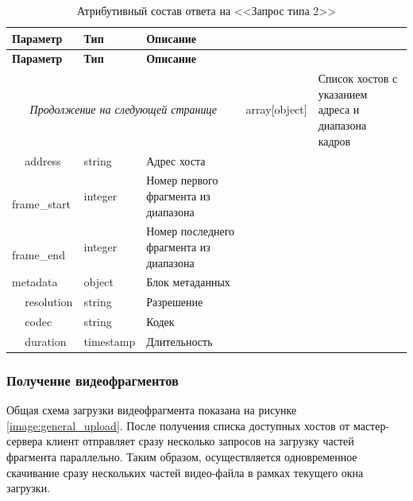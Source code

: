 \begin{longtable}{|p{4cm}|p{3cm}|p{8.5cm}|}
	\caption{Атрибутивный состав ответа на <<Запрос типа 2>>}\label{tbl:complaint_response}\\
	\hline
	
	\textbf{Параметр} & \textbf{Тип} & \textbf{Описание}\\ 
	\hline
	\endfirsthead
	
	\hline
	\textbf{Параметр} & \textbf{Тип} & \textbf{Описание}\\ 
	\hline
	\endhead
	
	\hline
	\multicolumn{3}{c}{\textit{Продолжение на следующей странице}}
	\endfoot
	\hline
	\endlastfoot
	
	hosts & 
	array[object] & 
	Список хостов с указанием адреса и диапазона кадров \\
	
	\hline
	\,\,\,\,\,\,\,address & 
	string & 
	Адрес хоста \\
	
	\hline
	\,\,\,\,\,\,\,frame\_start & 
	integer & 
	Номер первого фрагмента из диапазона \\
	
	\hline
	\,\,\,\,\,\,\,frame\_end & 
	integer & 
	Номер последнего фрагмента из диапазона \\
	
	\hline
	metadata & 
	object & 
	Блок метаданных \\
	
	\hline
	\,\,\,\,\,\,\,resolution & 
	string & 
	Разрешение \\
	
	\hline
	\,\,\,\,\,\,\,codec & 
	string & 
	Кодек \\
	
	\hline
	\,\,\,\,\,\,\,duration & 
	timestamp & 
	Длительность \\
\end{longtable}

\subsubsection{Получение видеофрагментов}
Общая схема загрузки видеофрагмента показана на рисунке \ref{image:general_upload}. После получения списка доступных хостов от мастер-сервера клиент отправляет сразу несколько запросов на загрузку частей фрагмента параллельно. Таким образом, осуществляется одновременное скачивание сразу нескольких частей видео-файла в рамках текущего окна загрузки. 

